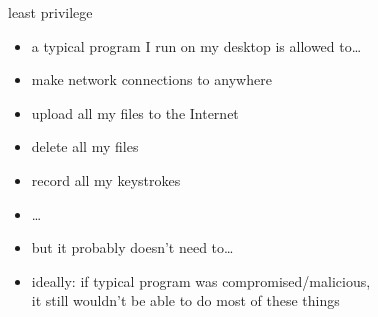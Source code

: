 
\begin{frame}{least privilege}
    \begin{itemize}
    \item a typical program I run on my desktop is allowed to\ldots
    \item make network connections to anywhere
    \item upload all my files to the Internet
    \item delete all my files
    \item record all my keystrokes
    \item \ldots
    \item but it probably doesn't need to\ldots
    \item ideally: if typical program was compromised/malicious, \\
          it still wouldn't be able to do most of these things
    \end{itemize}
\end{frame}

